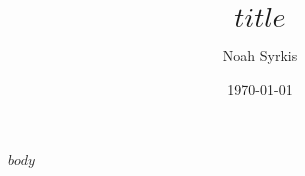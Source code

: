 \documentclass[12pt]{article}
\title{$title$}
\author{Noah Syrkis}
\date{\today}
\begin{document}
\maketitle %

$body$ %

\printbibliography %
\end{document}
